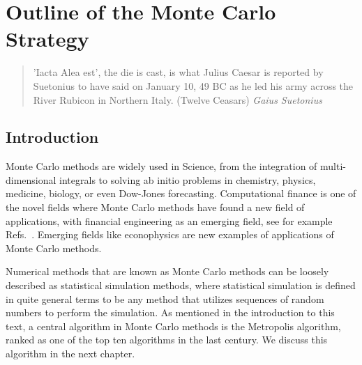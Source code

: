 



\chapter{Outline of the Monte Carlo Strategy}\label{chap:mcint} 
\begin{quotation}
'Iacta Alea est', the die is cast, 
is what Julius Caesar is reported by Suetonius to have said on January 10, 49 BC as he led his army across the River Rubicon in Northern Italy. (Twelve Ceasars) {\em Gaius Suetonius}
\end{quotation}

\section{Introduction}\label{sec:firstmc}
 
Monte Carlo methods are widely used in Science, from the integration of multi-dimensional
integrals to solving ab initio problems in chemistry, physics,
medicine, biology, or  even Dow-Jones forecasting. 
Computational finance is one of the novel fields
where Monte Carlo methods have found a new field of applications, with financial engineering as an emerging field,
see for example Refs.~\cite{glasserman,jackel}.  Emerging fields 
like econophysics \cite{voit2005,mccauley2004,sornette2002} 
are new examples of applications of Monte Carlo methods. 

Numerical methods that are known as Monte Carlo 
methods can be loosely described as
statistical simulation methods, where statistical 
simulation is defined in quite general terms to
be any method that utilizes sequences of random numbers to 
perform the simulation. As mentioned in the introduction to this text, a central algorithm
in Monte Carlo methods is the Metropolis algorithm, ranked as one of the top ten algorithms in the last century.
We discuss this algorithm in the next chapter. 


